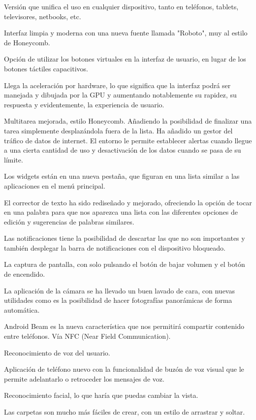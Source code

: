 \documentclass[12 pt, a4paper, twoside]{article}
\begin{document}
Versión que unifica el uso en cualquier dispositivo, tanto en
teléfonos, tablets, televisores, netbooks, etc.

Interfaz limpia y moderna con una nueva fuente llamada "Roboto", muy
al estilo de Honeycomb.

Opción de utilizar los botones virtuales en la interfaz de usuario, en
lugar de los botones táctiles capacitivos.

Llega la aceleración por hardware, lo que significa que la interfaz
podrá ser manejada y dibujada por la GPU y aumentando notablemente su
rapidez, su respuesta y evidentemente, la experiencia de usuario.

Multitarea mejorada, estilo Honeycomb. Añadiendo la posibilidad de finalizar una tarea simplemente desplazándola fuera de la lista.
Ha añadido un gestor del tráfico de datos de internet. El entorno le
permite establecer alertas cuando llegue a una cierta cantidad de uso
y desactivación de los datos cuando se pasa de su límite.

Los widgets están en una nueva pestaña, que figuran en una lista
similar a las aplicaciones en el menú principal.

El corrector de texto ha sido rediseñado y mejorado, ofreciendo la
opción de tocar en una palabra para que nos aparezca una lista con las
diferentes opciones de edición y sugerencias de palabras similares.

Las notificaciones tiene la posibilidad de descartar las que no son
importantes y también desplegar la barra de notificaciones con el
dispositivo bloqueado.

La captura de pantalla, con solo pulsando el botón de bajar volumen y
el botón de encendido.

La aplicación de la cámara se ha llevado un buen lavado de cara, con
nuevas utilidades como es la posibilidad de hacer fotografías
panorámicas de forma automática.

Android Beam es la nueva característica que nos permitirá compartir
contenido entre teléfonos. Vía NFC (Near Field Communication).

Reconocimiento de voz del usuario.

Aplicación de teléfono nuevo con la funcionalidad de buzón de voz
visual que le permite adelantarlo o retroceder los mensajes de voz.

Reconocimiento facial, lo que haría que puedas cambiar la vista.

Las carpetas son mucho más fáciles de crear, con un estilo de
arrastrar y soltar.
\end{document}
